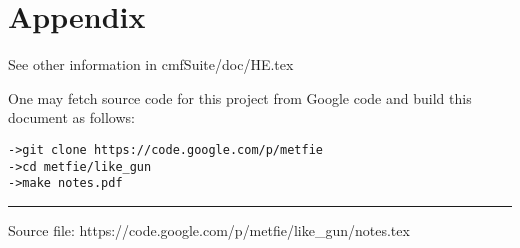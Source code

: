 \documentclass[11pt]{article}
\begin{document}
\section*{Appendix}
\label{sec:appendix}

See other information in cmfSuite/doc/HE.tex

One may fetch source code for this project from Google code and build
this document as follows:
\begin{verbatim}
->git clone https://code.google.com/p/metfie
->cd metfie/like_gun
->make notes.pdf
\end{verbatim}

%
\vfill \hrule

Source file: https://code.google.com/p/metfie/like\_gun/notes.tex
\end{document}
